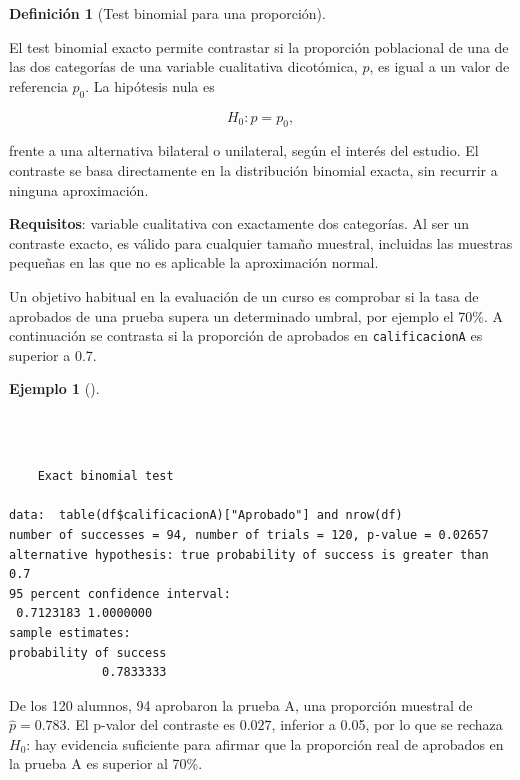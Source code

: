 \documentclass[
  spanish,
  a4paper,
]{scrreport}
\newenvironment{Shaded}{\begin{snugshade}}{\end{snugshade}}
\newcommand{\AttributeTok}[1]{\textcolor[rgb]{0.40,0.45,0.13}{#1}}
\newcommand{\FloatTok}[1]{\textcolor[rgb]{0.68,0.00,0.00}{#1}}
\newcommand{\FunctionTok}[1]{\textcolor[rgb]{0.28,0.35,0.67}{#1}}
\newcommand{\NormalTok}[1]{\textcolor[rgb]{0.00,0.23,0.31}{#1}}
\newcommand{\SpecialCharTok}[1]{\textcolor[rgb]{0.37,0.37,0.37}{#1}}
\newcommand{\StringTok}[1]{\textcolor[rgb]{0.13,0.47,0.30}{#1}}
\theoremstyle{definition}
\newtheorem{example}{Ejemplo}[chapter]
\theoremstyle{definition}
\newtheorem{definition}{Definición}[chapter]
\theoremstyle{remark}
\begin{document}
\begin{definition}[Test binomial para una
proporción]\protect\hypertarget{def-unapoblacion-test-binomial-proporcion}{}\label{def-unapoblacion-test-binomial-proporcion}

El test binomial exacto permite contrastar si la proporción poblacional
de una de las dos categorías de una variable cualitativa dicotómica,
\(p\), es igual a un valor de referencia \(p_0\). La hipótesis nula es

\[H_0: p = p_0,\]

frente a una alternativa bilateral o unilateral, según el interés del
estudio. El contraste se basa directamente en la distribución binomial
exacta, sin recurrir a ninguna aproximación.

\end{definition}

\textbf{Requisitos}: variable cualitativa con exactamente dos
categorías. Al ser un contraste exacto, es válido para cualquier tamaño
muestral, incluidas las muestras pequeñas en las que no es aplicable la
aproximación normal.

Un objetivo habitual en la evaluación de un curso es comprobar si la
tasa de aprobados de una prueba supera un determinado umbral, por
ejemplo el 70\%. A continuación se contrasta si la proporción de
aprobados en \texttt{calificacionA} es superior a 0.7.

\begin{example}[]\protect\hypertarget{exm-unapoblacion-test-binomial-proporcion}{}\label{exm-unapoblacion-test-binomial-proporcion}

~

\begin{Shaded}
\end{Shaded}

\begin{verbatim}

    Exact binomial test

data:  table(df$calificacionA)["Aprobado"] and nrow(df)
number of successes = 94, number of trials = 120, p-value = 0.02657
alternative hypothesis: true probability of success is greater than 0.7
95 percent confidence interval:
 0.7123183 1.0000000
sample estimates:
probability of success 
             0.7833333 
\end{verbatim}

De los 120 alumnos, 94 aprobaron la prueba A, una proporción muestral de
\(\hat{p}=0.783\). El p-valor del contraste es \(0.027\), inferior a
0.05, por lo que se rechaza \(H_0\): hay evidencia suficiente para
afirmar que la proporción real de aprobados en la prueba A es superior
al 70\%.

\end{example}
\end{document}
